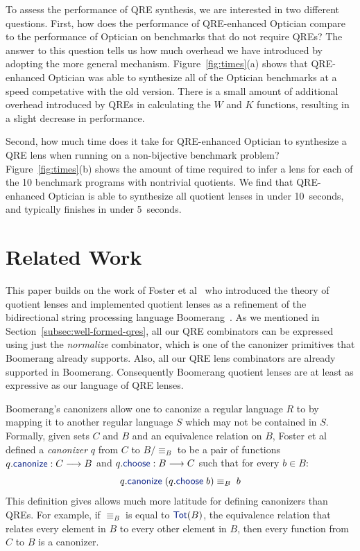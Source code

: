 \documentclass[acmsmall,review,anonymous]{acmart}
\newcommand{\kw}[1]{\textcolor{dkblue}{\ensuremath{\mathsf{#1}}}}
\newcommand{\QOpt}{QRE-enhanced Optician}
\begin{document}
To assess the performance of QRE synthesis, we are interested in two different
questions. First, how does the performance of \QOpt{} compare to the performance
of Optician on benchmarks that do not require QREs? The answer to this question
tells us how much overhead we have introduced by adopting the more general
mechanism. Figure~\ref{fig:times}(a) shows that \QOpt{} was able to synthesize
all of the Optician benchmarks at a speed competative with the old version.
There is a small amount of additional overhead introduced by QREs in calculating
the $W$ and $K$ functions, resulting in a slight decrease in performance.

Second, how much time does it take for \QOpt{} to synthesize a QRE
lens when running on a non-bijective benchmark problem?  
Figure~\ref{fig:times}(b) shows the amount of time required to infer a
lens for each of the 10 benchmark programs with nontrivial quotients.  
We find that \QOpt{} is able to synthesize all quotient lenses in
under 10~seconds, and typically finishes in under 5~seconds.

\section{Related Work}
\label{relwork}
This paper builds on the work of Foster et al~\cite{quotientlenses} who
introduced the theory of quotient lenses and implemented quotient lenses as a
refinement of the bidirectional string processing language
Boomerang~\cite{boomerang}. As we mentioned in
Section~\ref{subsec:well-formed-qres}, all our QRE combinators can be expressed
using just the {\em normalize} combinator, which is one of the canonizer
primitives that Boomerang already supports. Also, all our QRE lens combinators
are already supported in Boomerang. Consequently Boomerang quotient lenses are
at least as expressive as our language of QRE lenses. 

Boomerang's canonizers allow one to canonize a regular language $R$ to by
mapping it to another regular language $S$ which may not be contained in $S$.
Formally, given sets $C$ and $B$ and an equivalence relation on $B$, Foster et
al defined a {\em canonizer} $q$ from $C$ to $B/{\equiv_B}$ to be a pair of
functions $q.\kw{canonize} : C \longrightarrow B$ and $q.\kw{choose} : B
\longrightarrow C$ such that for every $b \in B$:
$$q.\kw{canonize} \; (q.\kw{choose} \; b) \equiv_B \; b$$
This definition gives allows much more latitude for defining canonizers than
QREs. For example, if $\equiv_B$ is equal to $\kw{Tot}(B)$, the equivalence
relation that relates every element in $B$ to every other element in $B$, then
every function from $C$ to $B$ is a canonizer.
\end{document}
